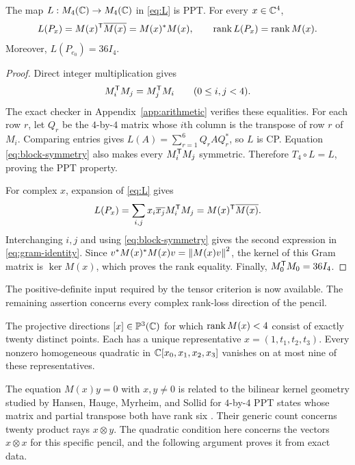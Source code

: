 \begin{lemma}\label{lem:pencil-ppt}
The map $L:M_{4}(\mathbb C)\to M_{4}(\mathbb C)$ in \eqref{eq:L} is PPT.  For every $x\in\mathbb C^4$,
\begin{equation}
 L(P_x)=M(x)^{\mathsf T}\overline{M(x)}=M(x)^*M(x),\qquad
 \operatorname{rank} L(P_x)=\operatorname{rank} M(x).
 \label{eq:gram-identity}
\end{equation}
Moreover, $L(P_{e_0})=36I_4$.
\end{lemma}

\begin{proof}
Direct integer multiplication gives
\begin{equation}
 M_i^{\mathsf T}M_j=M_j^{\mathsf T}M_i\qquad(0\leq i,j<4).
 \label{eq:block-symmetry}
\end{equation}
The exact checker in Appendix~\ref{app:arithmetic} verifies these
equalities.  For each row $r$, let $Q_r$ be the $4$-by-$4$ matrix whose
$i$th column is the transpose of row $r$ of $M_i$.  Comparing entries gives
$L(A)=\sum_{r=1}^6Q_rAQ_r^*$, so $L$ is CP.  Equation
\eqref{eq:block-symmetry} also makes every $M_i^{\mathsf T}M_j$ symmetric.
Therefore $T_4\circ L=L$, proving the PPT property.

For complex $x$, expansion of \eqref{eq:L} gives
\[
 L(P_x)=\sum_{i,j}x_i\overline{x_j}M_i^{\mathsf T}M_j
       =M(x)^{\mathsf T}\overline{M(x)}.
\]
Interchanging $i,j$ and using \eqref{eq:block-symmetry} gives the second
expression in \eqref{eq:gram-identity}.  Since
$v^*M(x)^*M(x)v=\left\lVert M(x)v\right\rVert^2$, the kernel of this Gram matrix is
$\ker M(x)$, which proves the rank equality.  Finally,
$M_0^{\mathsf T}M_0=36I_4$.
\end{proof}

The positive-definite input required by the tensor criterion is now
available.  The remaining assertion concerns every complex rank-loss
direction of the pencil.

\begin{proposition}
\label{prop:twenty-directions}
The projective directions $[x]\in\mathbb P^3(\mathbb C)$ for which
$\operatorname{rank} M(x)<4$ consist of exactly twenty distinct points.  Each has a
unique representative $x=(1,t_1,t_2,t_3)$.  Every nonzero homogeneous
quadratic in $\mathbb C[x_0,x_1,x_2,x_3]$ vanishes on at most nine of these
representatives.
\end{proposition}

The equation $M(x)y=0$ with $x,y\ne0$ is related to the bilinear kernel
geometry studied by Hansen, Hauge, Myrheim, and Sollid for $4$-by-$4$ PPT
states whose matrix and partial transpose both have rank six
\cite[Sections 2.2 and 7]{HansenEtAl2012}.
Their generic count concerns twenty product rays $x\otimes y$.  The
quadratic condition here concerns the vectors $x\otimes x$ for this
specific pencil, and the following argument proves it from exact data.

